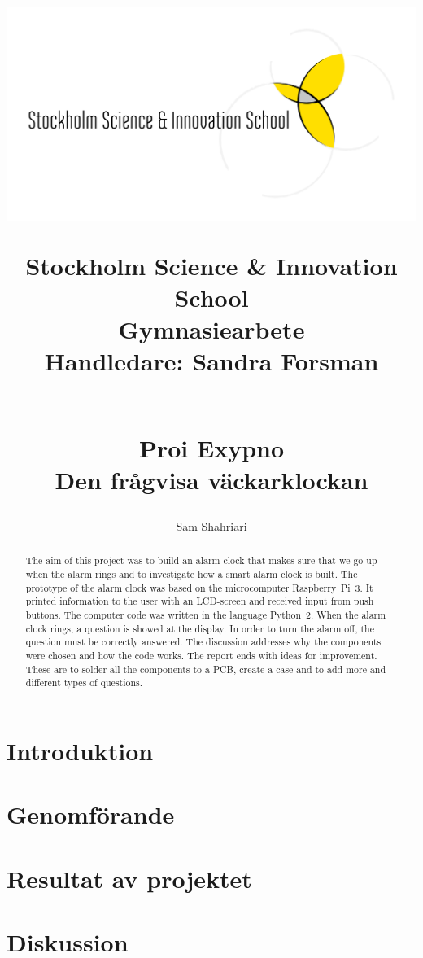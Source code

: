 \documentclass[12pt, a4paper,titlepage]{article}
\title{
\begin{minipage}{0.4\textwidth}
\includegraphics[width=\linewidth]{SSIS-logo(1).png}
\end{minipage}%
\hfill%
\begin{minipage}{0.6\textwidth}\raggedleft
\normalsize{Stockholm Science \& Innovation School
\\Gymnasiearbete
\\Handledare: Sandra Forsman}
\end{minipage}
\\[25ex]\Huge{Proi Exypno}\\{\large Den frågvisa väckarklockan}}
\author{\LARGE{Sam Shahriari}}
\date{}
\begin{document}
    \maketitle
    \begin{abstract}
    The aim of this project was to build an alarm clock that makes sure that we go up when the alarm rings and to investigate how a smart alarm clock is built. The prototype of the alarm clock was based on the microcomputer Raspberry~Pi~3. It printed information to the user with an LCD-screen and received input from push buttons. The computer code was written in the language Python~2. When the alarm clock rings, a question is showed at the display. In order to turn the alarm off, the question must be correctly answered. The discussion addresses why the components were chosen and how the code works. The report ends with ideas for improvement. These are to solder all the components to a PCB, create a case and to add more and different types of questions.

    \end{abstract}

    \tableofcontents
    \thispagestyle{empty}
    \newpage

    \setcounter{page}{3}
    
    
    \section{Introduktion}
    
    
    \section{Genomförande}
       

    \section{Resultat av projektet}
    
    
    \section{Diskussion}
    
    \newpage
    
\end{document}
